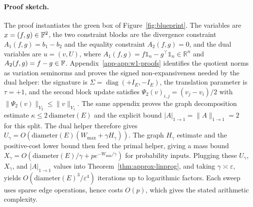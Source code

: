 \documentclass{article}
\theoremstyle{plain}
\newcommand{\ones}{\mathds{1}}
\newcommand{\Edge}{E}
\newcommand{\length}{W}
\newcommand{\RR}{\mathbb{R}}
\begin{document}
\paragraph{Proof sketch.}
The proof instantiates the green box of Figure~\ref{fig:blueprint}. The variables are $x=(f,g)\in\mathbb{F}^2$, the two constraint blocks are the divergence constraint $A_1(f,g)=b_1-b_2$ and the equality constraint $A_2(f,g)=0$, and the dual variables are $u=(v,U)$, where $A_{1}(f,g) = f\ones_{n}-g^{\!\top}\ones_{n}\in\RR^{n}$ and $A_{2}(f,g) = f-g\in\mathbb{F}$.
%
Appendix~\ref{app-app:w1-proofs} identifies the quotient norms as variation seminorms and proves the signed non-expansiveness needed by the dual helper: the signature is $\Sigma=\operatorname{diag}(+I_{\Edge},-I_{\Edge})$, the translation parameter is $\tau=+1$, and the second block update satisfies $\Psi_2(v)_{i,j}=(v_j-v_i)/2$ with $\|\Psi_2(v)\|_{V_2}\le\|v\|_{V_1}$. The same appendix proves the graph decomposition estimate $\kappa\le 2\,\mathrm{diameter}(\Edge)$ and the explicit bound $|A|_{1\to1}=\|A\|_{1\to1}=2$ for this split.
%
The dual helper therefore gives $U_\gamma=O(\mathrm{diameter}(\Edge)(\length_{\max}+\gamma H_\gamma))$. The graph $H_\gamma$ estimate and the positive-cost lower bound then feed the primal helper, giving a mass bound $X_\gamma=O(\mathrm{diameter}(\Edge)/\gamma+p e^{-\length_{\min}/\gamma})$ for probability inputs. Plugging these $U_\gamma$, $X_\gamma$, and $|A|_{1\to1}$ values into Theorem~\ref{thm:approx-linprog}, and taking $\gamma\asymp\varepsilon$, yields $O(\mathrm{diameter}(\Edge)^3/\varepsilon^4)$ iterations up to logarithmic factors. Each sweep uses sparse edge operations, hence costs $O(p)$, which gives the stated arithmetic complexity.
\end{document}
